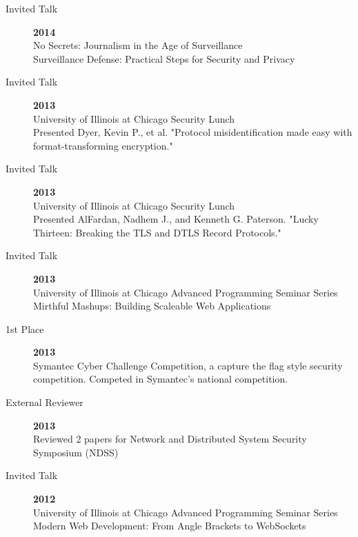 \documentclass{vitae}
\begin{document}
\begin{description}
    \item[Invited Talk] \hfill \textbf{2014}\\
    No Secrets: Journalism in the Age of Surveillance\\
    Surveillance Defense: Practical Steps for Security and Privacy

    \item[Invited Talk] \hfill \textbf{2013}\\
    University of Illinois at Chicago Security Lunch\\
    Presented Dyer, Kevin P., et al. "Protocol misidentification made easy with format-transforming encryption."

    \item[Invited Talk] \hfill \textbf{2013}\\
    University of Illinois at Chicago Security Lunch\\
    Presented AlFardan, Nadhem J., and Kenneth G. Paterson. "Lucky Thirteen: Breaking the TLS and DTLS Record Protocols."

    \item[Invited Talk] \hfill \textbf{2013}\\
    University of Illinois at Chicago Advanced Programming Seminar Series\\
    Mirthful Mashups: Building Scaleable Web Applications

    \item[1st Place] \hfill \textbf{2013}\\
    Symantec Cyber Challenge Competition, a capture the flag style security competition.  Competed in Symantec's national competition.

    \item[External Reviewer] \hfill \textbf{2013}\\
    Reviewed 2 papers for Network and Distributed System Security Symposium (NDSS)

    \item[Invited Talk] \hfill \textbf{2012}\\
    University of Illinois at Chicago Advanced Programming Seminar Series\\
    Modern Web Development: From Angle Brackets to WebSockets
  \end{description}
\end{document}

